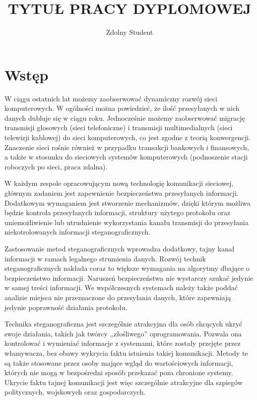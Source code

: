 \documentclass[a4paper,12pt,twoside,openany]{report}
\title{TYTUŁ PRACY DYPLOMOWEJ}
\author{Zdolny Student}
\begin{document}
\maketitle

\chapter{Wstęp}
W ciągu ostatnich lat możemy zaobserwować dynamiczny rozwój sieci komputerowych. W ogólności można powiedzieć, że ilość przesyłanych w nich danych dubluje się w ciągu roku. Jednocześnie możemy zaobserwować migrację transmisji głosowych (sieci telefoniczne) i transmisji multimedialnych (sieci telewizji kablowej) do sieci komputerowych, co jest zgodne z teorią konwergencji. Znaczenie sieci rośnie również w przypadku transakcji bankowych i finansowych, a także w stosunku do sieciowych systemów komputerowych (podnoszenie stacji roboczych po sieci, praca zdalna).

W każdym zespole opracowującym nową technologię komunikacji sieciowej, głównym zadaniem jest zapewnienie bezpieczeństwa przesyłanych informacji. Dodatkowym wymaganiem jest stworzenie mechanizmów, dzięki którym możliwa będzie kontrola przesyłanych informacji, struktury użytego protokołu oraz uniemożliwienie lub utrudnienie wykorzystania kanału transmisji do przesyłania niekotrolowanych informacji steganograficznych. 

Zastosowanie metod steganograficznych wprowadza dodatkowy, tajny kanał informacji w ramach legalnego strumienia danych. Rozwój technik steganograficznych nakłada coraz to większe wymagania na algorytmy dbające o bezpieczeństwo informacji. Naruszeń bezpieczeństwa nie wystarczy szukać jedynie w samej treści informacji. We współczesnych systemach należy także poddać analizie miejsca nie przeznaczone do przesyłania danych, które zapewniają jedynie poprawność działania protokołu.

Technika steganograficzna jest szczególnie atrakcyjna dla osób chcących ukryć swoje działania, takich jak twórcy ,,złośliwego'' oprogramowania. Pozwala ona kontrolować i wymieniać informacje z systemami, które zostały przejęte przez włamywacza, bez obawy wykrycia faktu istnienia takiej komunikacji. Metody te są także stosowane przez osoby mające wgląd do wartościowych informacji, których nie mogą w bezpośredni sposób przekazać poza chronione systemy. Ukrycie faktu tajnej komunikacji jest więc szczególnie atrakcyjne dla szpiegów politycznych, wojskowych oraz gospodarczych.
\end{document}

